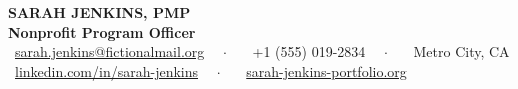 \documentclass[10pt,oneside]{article}
\begin{document}
\begin{center}
  {\Huge \textbf{\color{primary}SARAH JENKINS, PMP}} \\
  \vspace{0.3em}
  {\large\textbf{\color{secondary}Nonprofit Program Officer}} \\
  \vspace{0.5em}
  {\small
  \faEnvelope\ \href{mailto:sarah.jenkins@fictionalmail.org}{sarah.jenkins@fictionalmail.org} \ \ $\cdot$ \ \ 
  \faPhone\ +1 (555) 019-2834 \ \ $\cdot$ \ \ 
  \faMapMarker\ Metro City, CA \\
  \vspace{0.25em}
  \faLinkedin\ \href{https://linkedin.com/in/fictional-sarah-jenkins}{linkedin.com/in/sarah-jenkins} \ \ $\cdot$ \ \ 
  \faGlobe\ \href{https://fictional-portfolio.org}{sarah-jenkins-portfolio.org}
  }
\end{center}

\vspace{0.8em}
\end{document}

